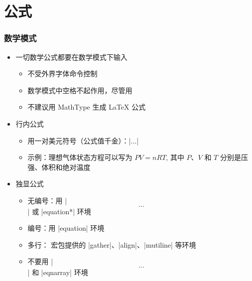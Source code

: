 \section{公式}

\begin{frame}[fragile]
\frametitle{数学模式}
\begin{itemize}
  \item<+-> 一切数学公式都要在数学模式下输入
    \begin{itemize}
      \item 不受外界字体命令控制
      \item 数学模式中空格不起作用，尽管用
      \item \alert{不建议用 MathType 生成 \LaTeX{} 公式}
    \end{itemize}
  \item<+-> 行内公式
    \begin{itemize}
      \item 用一对美元符号（公式值千金）：|$...$|
      \item 示例：理想气体状态方程可以写为 \alert{$PV=nRT$}, 其中
            \alert{$P$}、\alert{$V$} 和 \alert{$T$} 分别是压强、体积和绝对温度
    \end{itemize}
  \item<+-> 独显公式
    \begin{itemize}
      \item 无编号：用 |\[...\]| 或 |equation*| 环境
      \item 编号：用 |equation| 环境
      \item 多行： 宏包提供的 |gather|、|align|、|mutiline| 等环境
      \item \alert{不要用} |$$...$$| \alert{和} |eqnarray| \alert{环境}
    \end{itemize}
\end{itemize}
\end{frame}

